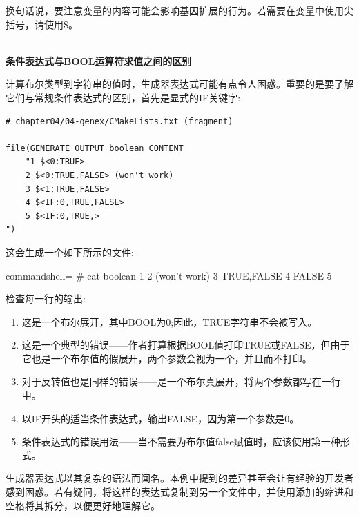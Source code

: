 换句话说，要注意变量的内容可能会影响基因扩展的行为。若需要在变量中使用尖括号，请使用\$<ANGLE-R>。

\hspace*{\fill} \\ %
\noindent
\textbf{条件表达式与BOOL运算符求值之间的区别}

计算布尔类型到字符串的值时，生成器表达式可能有点令人困惑。重要的是要了解它们与常规条件表达式的区别，首先是显式的IF关键字:

\begin{lstlisting}[style=styleCMake]
# chapter04/04-genex/CMakeLists.txt (fragment)

file(GENERATE OUTPUT boolean CONTENT
	"1 $<0:TRUE>
	2 $<0:TRUE,FALSE> (won't work)
	3 $<1:TRUE,FALSE>
	4 $<IF:0,TRUE,FALSE>
	5 $<IF:0,TRUE,>
")
\end{lstlisting}

这会生成一个如下所示的文件:

\begin{tcblisting}{commandshell={}}
# cat boolean
1
  2 (won't work)
  3 TRUE,FALSE 
  4 FALSE
  5
\end{tcblisting}

检查每一行的输出:

\begin{enumerate}
\item 
这是一个布尔展开，其中BOOL为0;因此，TRUE字符串不会被写入。

\item 
这是一个典型的错误——作者打算根据BOOL值打印TRUE或FALSE，但由于它也是一个布尔值的假展开，两个参数会视为一个，并且而不打印。

\item 
对于反转值也是同样的错误——是一个布尔真展开，将两个参数都写在一行中。

\item 
以IF开头的适当条件表达式，输出FALSE，因为第一个参数是0。

\item 
条件表达式的错误用法——当不需要为布尔值false赋值时，应该使用第一种形式。
\end{enumerate}

生成器表达式以其复杂的语法而闻名。本例中提到的差异甚至会让有经验的开发者感到困惑。若有疑问，将这样的表达式复制到另一个文件中，并使用添加的缩进和空格将其拆分，以便更好地理解它。










